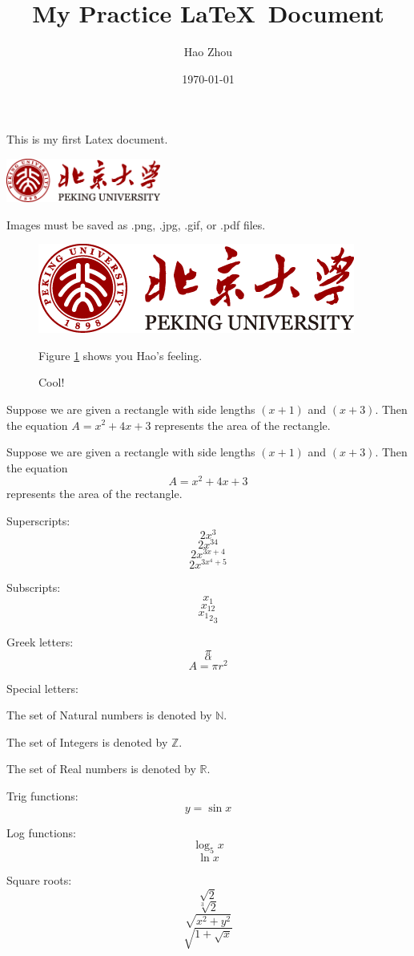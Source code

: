 \documentclass[11pt]{article}
\begin{document}
\tableofcontents

\title{My Practice \LaTeX \ Document}
\author{Hao Zhou}
\date{\today}
\maketitle

This is my first Latex document.

\begin{center}
\includegraphics[width=2in,angle=30]{pku.png}

Images must be saved as .png, .jpg, .gif, or .pdf files.
\end{center}

\begin{figure}[htbp]
\centering
\includegraphics[width=.3\textwidth]{pku.png}
\caption{Cool!}
\label{fig:pku}
Figure \ref{fig:pku} shows you Hao's feeling.
\end{figure}

Suppose we are given a rectangle with side
lengths $(x+1)$ and $(x+3)$. Then the equation
$A=x^2+4x+3$ represents the area of the rectangle.

Suppose we are given a rectangle with side
lengths $(x+1)$ and $(x+3)$. Then the equation
$$A=x^2+4x+3$$ represents the area of the rectangle.

Superscripts: $$2x^3$$
$$2x^{34}$$
$$2x^{3x+4}$$
$$2x^{3x^4+5}$$

Subscripts:
$$x_1$$
$$x_{12}$$
$${{x_1}_2}_3$$

Greek letters:
$$\pi$$
$$\alpha$$
$$A=\pi r^2$$

Special letters:

The set of Natural numbers is denoted by $\mathbb{N}$.

The set of Integers is denoted by $\mathbb{Z}$.

The set of Real numbers is denoted by $\mathbb{R}$.


Trig functions:
$$y=\sin{x}$$

Log functions:
$$\log_5{x}$$
$$\ln{x}$$

Square roots:
$$\sqrt{2}$$
$$\sqrt[3]{2}$$
$$\sqrt{x^2+y^2}$$
$$\sqrt{1+\sqrt{x}}$$
\end{document}
